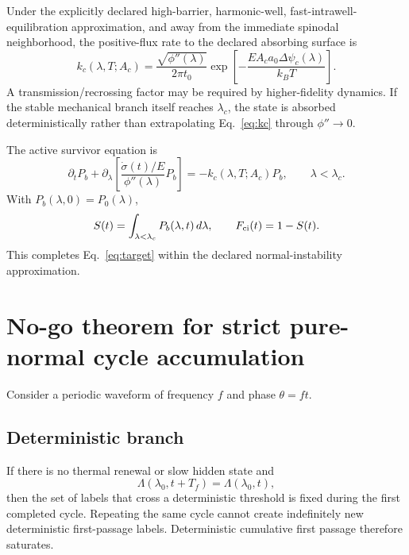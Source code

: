 \documentclass[11pt]{article}
\begin{document}
Under the explicitly declared high-barrier, harmonic-well, fast-intrawell-equilibration approximation, and away from the immediate spinodal neighborhood, the positive-flux rate to the declared absorbing surface is
\begin{equation}
k_c(\lambda,T;A_c)
=\frac{\sqrt{\phi''(\lambda)}}{2\pi t_0}
\exp\left[-\frac{EA_ca_0\Delta\psi_c(\lambda)}{k_BT}\right].
\label{eq:kc}
\end{equation}
A transmission/recrossing factor may be required by higher-fidelity dynamics. If the stable mechanical branch itself reaches $\lambda_c$, the state is absorbed deterministically rather than extrapolating Eq.~\eqref{eq:kc} through $\phi''\to0$.

The active survivor equation is
\begin{equation}
\boxed{
\partial_tP_b
+\partial_\lambda\left[
\frac{\dot\sigma(t)/E}{\phi''(\lambda)}P_b
\right]
=-k_c(\lambda,T;A_c)P_b,
\qquad \lambda<\lambda_c.
}
\label{eq:survivor}
\end{equation}
With $P_b(\lambda,0)=P_0(\lambda)$,
\begin{equation}
S(t)=\int_{\lambda<\lambda_c}P_b(\lambda,t)\,d\lambda,
\qquad
F_{\rm ci}(t)=1-S(t).
\end{equation}
This completes Eq.~\eqref{eq:target} within the declared normal-instability approximation.

\section{No-go theorem for strict pure-normal cycle accumulation}
Consider a periodic waveform of frequency $f$ and phase $\theta=ft$.

\subsection{Deterministic branch}
If there is no thermal renewal or slow hidden state and
\begin{equation}
\Lambda(\lambda_0,t+T_f)=\Lambda(\lambda_0,t),
\end{equation}
then the set of labels that cross a deterministic threshold is fixed during the first completed cycle. Repeating the same cycle cannot create indefinitely new deterministic first-passage labels. Deterministic cumulative first passage therefore saturates.
\end{document}
